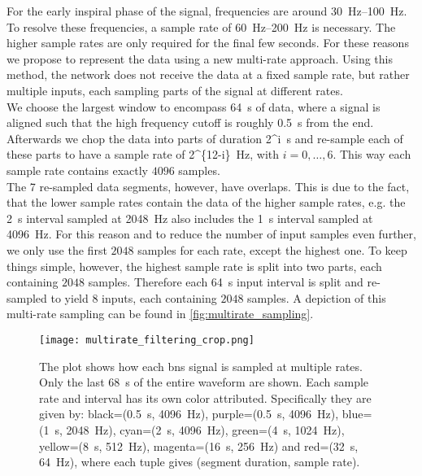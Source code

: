 For the early inspiral phase of the signal, frequencies are around \SIrange{30}{100}{\hertz}. To resolve these frequencies, a sample rate of \SIrange{60}{200}{\hertz} is necessary. The higher sample rates are only required for the final few seconds. For these reasons we propose to represent the data using a new multi-rate approach. Using this method, the network does not receive the data at a fixed sample rate, but rather multiple inputs, each sampling parts of the signal at different rates.\\
We choose the largest window to encompass \SI{64}{\s} of data, where a signal is aligned such that the high frequency cutoff is roughly \SI{0.5}{\s} from the end. Afterwards we chop the data into parts of duration \SI[parse-numbers=false]{2^i}{\s} and re-sample each of these parts to have a sample rate of \SI[parse-numbers=false]{2^{12-i}}{\hertz}, with $i=0,\dotsc ,6$. This way each sample rate contains exactly $4096$ samples.\\
The 7 re-sampled data segments, however, have overlaps. This is due to the fact, that the lower sample rates contain the data of the higher sample rates, e.g. the \SI{2}{\s} interval sampled at \SI{2048}{\hertz} also includes the \SI{1}{\s} interval sampled at \SI{4096}{\hertz}. For this reason and to reduce the number of input samples even further, we only use the first $2048$ samples for each rate, except the highest one. To keep things simple, however, the highest sample rate is split into two parts, each containing $2048$ samples. Therefore each \SI{64}{\s} input interval is split and re-sampled to yield 8 inputs, each containing $2048$ samples. A depiction of this multi-rate sampling can be found in \autoref{fig:multirate_sampling}.
\begin{figure}
\centering
\texttt{[image: multirate\_filtering\_crop.png]}
\caption[Multi-rate sampling]{The plot shows how each \gls{bns} signal is sampled at multiple rates. Only the last \SI{68}{\s} of the entire waveform are shown. Each sample rate and interval has its own color attributed. Specifically they are given by: black=(\SI{0.5}{\s}, \SI{4096}{\hertz}), purple=(\SI{0.5}{\s}, \SI{4096}{\hertz}), blue=(\SI{1}{\s}, \SI{2048}{\hertz}), cyan=(\SI{2}{\s}, \SI{4096}{\hertz}), green=(\SI{4}{\s}, \SI{1024}{\hertz}), yellow=(\SI{8}{\s}, \SI{512}{\hertz}), magenta=(\SI{16}{\s}, \SI{256}{\hertz}) and red=(\SI{32}{\s}, \SI{64}{\hertz}), where each tuple gives (segment duration, sample rate).}\label{fig:multirate_sampling}
\end{figure}
